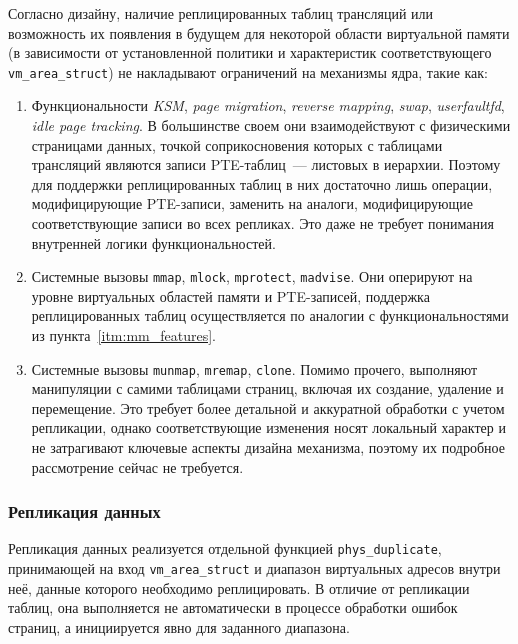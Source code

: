 Согласно дизайну, наличие реплицированных таблиц трансляций или возможность их появления в будущем для некоторой области виртуальной памяти (в зависимости от установленной политики и характеристик соответствующего \texttt{vm\_area\_struct}) не накладывают ограничений на механизмы ядра, такие как:
\begin{enumerate}
    \item\label{itm:mm_features} Функциональности \textit{KSM}\cite{KSM}, \textit{page migration}\cite{page_migration}, \textit{reverse mapping}\cite{rmap1,rmap2}, \textit{swap}, \textit{userfaultfd}\cite{userfaultfd}, \textit{idle page tracking}\cite{page_idle}. В большинстве своем они взаимодействуют с физическими страницами данных, точкой соприкосновения которых с таблицами трансляций являются записи PTE-таблиц~--- листовых в иерархии. Поэтому для поддержки реплицированных таблиц в них достаточно лишь операции, модифицирующие PTE-записи, заменить на аналоги, модифицирующие соответствующие записи во всех репликах. Это даже не требует понимания внутренней логики функциональностей.

    \item Системные вызовы \texttt{mmap}\cite{mmap}, \texttt{mlock}\cite{mlock}, \texttt{mprotect}\cite{mprotect}, \texttt{madvise}\cite{madvise}. Они оперируют на уровне виртуальных областей памяти и PTE-записей, поддержка реплицированных таблиц осуществляется по аналогии с функциональностями из пункта~\ref{itm:mm_features}.

    \item Системные вызовы \texttt{munmap}\cite{munmap}, \texttt{mremap}\cite{mremap}, \texttt{clone}\cite{clone}. Помимо прочего, выполняют манипуляции с самими таблицами страниц, включая их создание, удаление и перемещение. Это требует более детальной и аккуратной обработки с учетом репликации, однако соответствующие изменения носят локальный характер и не затрагивают ключевые аспекты дизайна механизма, поэтому их подробное рассмотрение сейчас не требуется.
\end{enumerate}

\subsubsection{Репликация данных}
\label{sec:Chapter3_data_repl}

Репликация данных реализуется отдельной функцией \texttt{phys\_duplicate}, принимающей на вход \texttt{vm\_area\_struct} и диапазон виртуальных адресов внутри неё, данные которого необходимо реплицировать. В отличие от репликации таблиц, она выполняется не автоматически в процессе обработки ошибок страниц, а инициируется явно для заданного диапазона.

